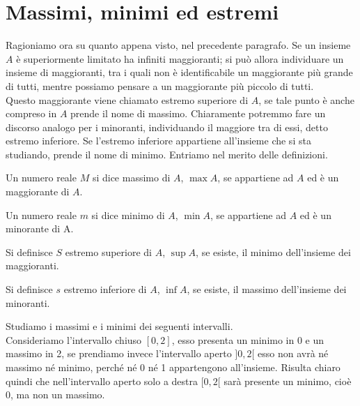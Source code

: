 \section{Massimi, minimi ed estremi}
Ragioniamo ora su quanto appena visto, nel precedente paragrafo. Se un 
insieme \(A\) è superiormente limitato ha infiniti maggioranti; si può allora 
individuare un insieme di maggioranti, tra i quali non è identificabile un 
maggiorante più grande di tutti, mentre possiamo pensare a un maggiorante più 
piccolo di tutti.\\

Questo maggiorante viene chiamato estremo superiore di \(A\), se tale punto è 
anche compreso in \(A\) prende il nome di massimo. Chiaramente potremmo fare un 
discorso analogo per i minoranti, individuando il maggiore tra di essi, detto 
estremo inferiore. Se l'estremo inferiore appartiene all'insieme che si sta 
studiando, prende il nome di minimo. Entriamo nel merito delle definizioni.\\

\begin{definizione}
  Un numero reale \(M\) si dice massimo di \(A\), \(\max{A}\), se appartiene 
ad \(A\) ed è un maggiorante di \(A\).\\
\end{definizione}

\begin{definizione}
  Un numero reale \(m\) si dice minimo di \(A\), \(\min{A}\), se appartiene 
ad \(A\) ed è un minorante di A.\\
\end{definizione}

\begin{definizione}
  Si definisce \(S\) estremo superiore di \(A\), \(\sup{A}\), se esiste, il 
minimo dell'insieme dei maggioranti.\\
\end{definizione}

\begin{definizione}
  Si definisce \(s\) estremo inferiore di \(A\), \(\inf{A}\), se esiste, il 
massimo dell'insieme dei minoranti.\\
\end{definizione}

\begin{esempio}Studiamo i massimi e i minimi dei seguenti intervalli.\\
Consideriamo l'intervallo chiuso \([0,2]\), esso presenta un minimo in 0 e un 
massimo in 2, se prendiamo invece l'intervallo aperto \(]0,2[\) esso non avrà 
né massimo né minimo, perché né 0 né 1 appartengono all'insieme. Risulta 
chiaro quindi che nell'intervallo aperto solo a destra \([0,2[\) sarà presente 
un minimo, cioè 0, ma non un massimo.\\
\end{esempio}

